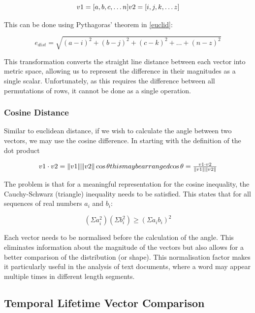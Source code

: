   \begin{equation}
  v1 = [ a,b,c, \dots n ]
  $$$$
  v2 = [ i,j,k, \dots z ]
  \end{equation}

  This can be done using Pythagoras' theorem in \autoref{euclid}:

  \begin{equation}
  e_{dist}  = \sqrt{(a-i)^2 + (b-j)^2 + (c-k)^2 + \dots + (n-z)^2}
  \label{euclid}
  \end{equation}

  This transformation converts the straight line distance between each vector into metric space, allowing us to represent the difference in their magnitudes as a single scalar. Unfortunately, as this requires the difference between all permutations of rows, it cannot be done as a single operation.

  \subsubsection{Cosine Distance}\label{sec:cosine}
  Similar to euclidean distance, if we wish to calculate the angle between two vectors, we may use the cosine difference. In starting with the definition of the dot product

  \begin{equation}
  v1 \cdot v2 = \|v1\|\|v2\| \cos \theta
  $$this may be arranged$$
  \cos \theta = \frac{ v1 \cdot v2}{\|v1\|\|v2\|}
  \end{equation}

  The problem is that for a meaningful representation for the cosine inequality, the Cauchy-Schwarz (triangle) inequality needs to be satisfied. This states that for all sequences of real numbers $a_i$ and $b_i$:

  \begin{equation}
      (\Sigma a^2_i)(\Sigma b^2_i) \ge (\Sigma a_ib_i)^2
  \end{equation}

  Each vector needs to be normalised before the calculation of the angle. This eliminates information about the magnitude of the vectors but also allows for a better comparison of the distribution (or shape). This normalisation factor makes it particularly useful in the analysis of text documents, where a word may appear multiple times in different length segments.



  \subsection{Temporal Lifetime Vector Comparison}

